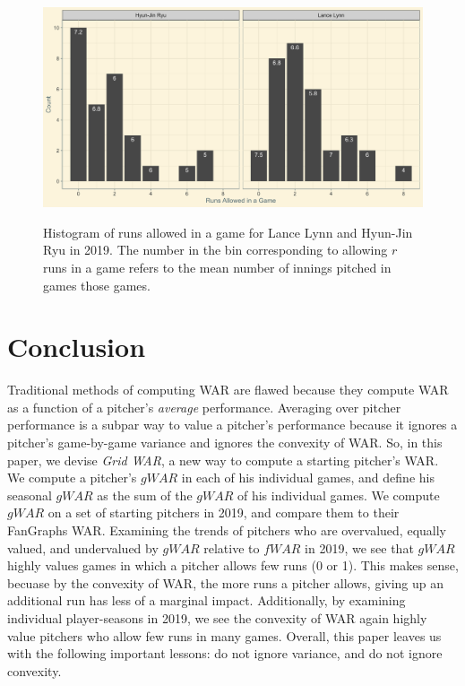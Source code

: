 \documentclass[12pt]{article}
\begin{document}
\begin{figure}[t!]
\centering
\caption{Histogram of runs allowed in a game for Lance Lynn and Hyun-Jin Ryu in 2019. The number in the bin corresponding to allowing $r$ runs in a game refers to the mean number of innings pitched in games those games.} 
\includegraphics[width=15cm]{../writeup_plots/plot_Lynn_Ryu_2019.png}
\label{fig:cumRunsLynnRyu}
\end{figure}






\section{Conclusion}

Traditional methods of computing WAR are flawed because they compute WAR as a function of a pitcher's \textit{average} performance. Averaging over pitcher performance is a subpar way to value a pitcher's performance because it ignores a pitcher's game-by-game variance and ignores the convexity of WAR. So, in this paper, we devise \textit{Grid WAR}, a new way to compute a starting pitcher's WAR. We compute a pitcher's $gWAR$ in each of his individual games, and define his seasonal $gWAR$ as the sum of the $gWAR$ of his individual games. We compute $gWAR$ on a set of starting pitchers in 2019, and compare them to their FanGraphs WAR. Examining the trends of pitchers who are overvalued, equally valued, and undervalued by $gWAR$ relative to $fWAR$ in 2019, we see that $gWAR$ highly values games in which a pitcher allows few runs (0 or 1). This makes sense, becuase by the convexity of WAR, the more runs a pitcher allows, giving up an additional run has less of a marginal impact. Additionally, by examining individual player-seasons in 2019, we see the convexity of WAR again highly value pitchers who allow few runs in many games. Overall, this paper leaves us with the following important lessons: do not ignore variance, and do not ignore convexity.
\end{document}
